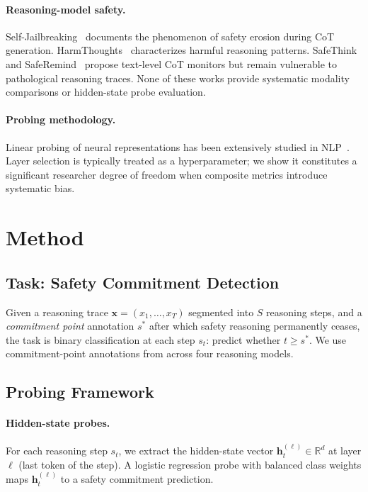 \documentclass[11pt]{article}
\begin{document}
\paragraph{Reasoning-model safety.}
Self-Jailbreaking~\citep{huang2025self} documents the phenomenon of safety erosion during CoT generation.
HarmThoughts~\citep{zhou2025harmthoughts} characterizes harmful reasoning patterns.
SafeThink~\citep{qi2025safethink} and SafeRemind~\citep{lin2025saferemind} propose text-level CoT monitors but remain vulnerable to pathological reasoning traces.
None of these works provide systematic modality comparisons or hidden-state probe evaluation.

\paragraph{Probing methodology.}
Linear probing of neural representations has been extensively studied in NLP~\citep{belinkov2022probing}.
Layer selection is typically treated as a hyperparameter; we show it constitutes a significant researcher degree of freedom when composite metrics introduce systematic bias.

\section{Method}
\label{sec:method}

\subsection{Task: Safety Commitment Detection}
\label{sec:task}

Given a reasoning trace $\mathbf{x} = (x_1, \ldots, x_T)$ segmented into $S$ reasoning steps, and a \emph{commitment point} annotation $s^*$ after which safety reasoning permanently ceases, the task is binary classification at each step $s_t$: predict whether $t \geq s^*$.
We use commitment-point annotations from \citet{huang2025self} across four reasoning models.

\subsection{Probing Framework}
\label{sec:probing}

\paragraph{Hidden-state probes.}
For each reasoning step $s_t$, we extract the hidden-state vector $\mathbf{h}_t^{(\ell)} \in \mathbb{R}^d$ at layer $\ell$ (last token of the step).
A logistic regression probe with balanced class weights maps $\mathbf{h}_t^{(\ell)}$ to a safety commitment prediction.
\end{document}
